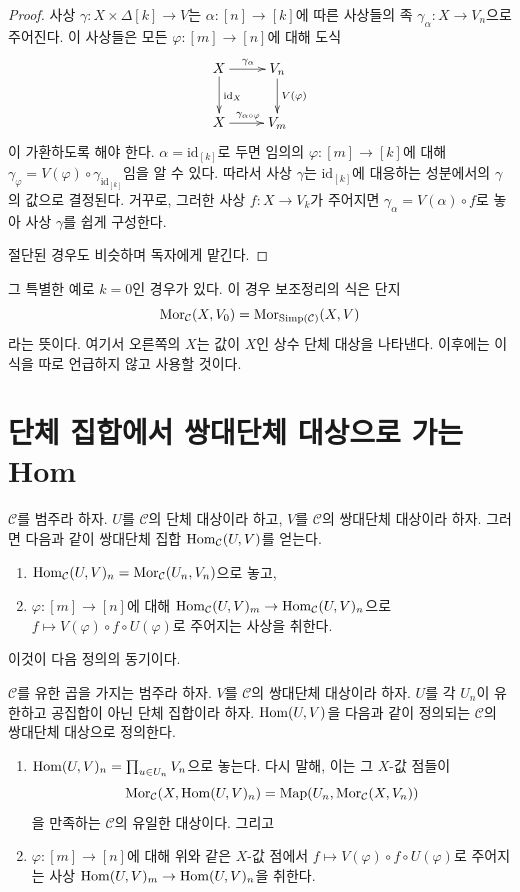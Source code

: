 \begin{proof}
사상 $\gamma : X \times \Delta[k] \to V$는
$\alpha : [n] \to [k]$에 따른 사상들의 족
$\gamma_\alpha : X \to V_n$으로 주어진다.
이 사상들은 모든 $\varphi : [m] \to [n]$에 대해 도식
$$
\xymatrix{
X \ar[r]^{\gamma_\alpha} \ar[d]^{\text{id}_X} & V_n \ar[d]^{V(\varphi)} \\
X \ar[r]^{\gamma_{\alpha \circ \varphi}} & V_m
}
$$
이 가환하도록 해야 한다. $\alpha = \text{id}_{[k]}$로 두면
임의의 $\varphi : [m] \to [k]$에 대해
$\gamma_\varphi = V(\varphi) \circ \gamma_{\text{id}_{[k]}}$임을 알 수 있다.
따라서 사상 $\gamma$는 $\text{id}_{[k]}$에 대응하는 성분에서의
$\gamma$의 값으로 결정된다. 거꾸로, 그러한 사상
$f : X \to V_k$가 주어지면
$\gamma_\alpha = V(\alpha) \circ f$로 놓아 사상 $\gamma$를 쉽게 구성한다.

\medskip\noindent
절단된 경우도 비슷하며 독자에게 맡긴다.
\end{proof}

\noindent
그 특별한 예로 $k = 0$인 경우가 있다.
이 경우 보조정리의 식은 단지
$$
\mathop{\mathrm{Mor}}\nolimits_\mathcal{C}(X, V_0)
=
\mathop{\mathrm{Mor}}\nolimits_{\text{Simp}(\mathcal{C})}(X, V)
$$
라는 뜻이다. 여기서 오른쪽의 $X$는 값이 $X$인 상수 단체 대상을
나타낸다. 이후에는 이 식을 따로 언급하지 않고 사용할 것이다.




\section{단체 집합에서 쌍대단체 대상으로 가는 Hom}
\label{section-hom-from-simplicial-sets-into-cosimplicial}

\noindent
$\mathcal{C}$를 범주라 하자.
$U$를 $\mathcal{C}$의 단체 대상이라 하고,
$V$를 $\mathcal{C}$의 쌍대단체 대상이라 하자.
그러면 다음과 같이 쌍대단체 집합 $\mathop{\mathrm{Hom}}\nolimits_\mathcal{C}(U, V)$를 얻는다.
\begin{enumerate}
\item $\mathop{\mathrm{Hom}}\nolimits_\mathcal{C}(U, V)_n = \mathop{\mathrm{Mor}}\nolimits_\mathcal{C}(U_n, V_n)$으로 놓고,
\item $\varphi : [m] \to [n]$에 대해
$\mathop{\mathrm{Hom}}\nolimits_\mathcal{C}(U, V)_m \to \mathop{\mathrm{Hom}}\nolimits_\mathcal{C}(U, V)_n$으로
$f \mapsto V(\varphi) \circ f \circ U(\varphi)$로 주어지는 사상을 취한다.
\end{enumerate}
이것이 다음 정의의 동기이다.

\begin{definition}
\label{definition-hom-deltak-cosimplicial}
$\mathcal{C}$를 유한 곱을 가지는 범주라 하자.
$V$를 $\mathcal{C}$의 쌍대단체 대상이라 하자.
$U$를 각 $U_n$이 유한하고 공집합이 아닌 단체 집합이라 하자.
{{\it $\mathop{\mathrm{Hom}}\nolimits(U, V)$}}을 다음과 같이 정의되는
$\mathcal{C}$의 쌍대단체 대상으로 정의한다.
\begin{enumerate}
\item $\mathop{\mathrm{Hom}}\nolimits(U, V)_n = \prod_{u \in U_n} V_n$으로 놓는다.
다시 말해, 이는 그 $X$-값 점들이
$$
\mathop{\mathrm{Mor}}\nolimits_\mathcal{C}(X, \mathop{\mathrm{Hom}}\nolimits(U, V)_n)
=
\text{Map}(U_n, \mathop{\mathrm{Mor}}\nolimits_\mathcal{C}(X, V_n))
$$
을 만족하는 $\mathcal{C}$의 유일한 대상이다. 그리고
\item $\varphi : [m] \to [n]$에 대해 위와 같은 $X$-값 점에서
$f \mapsto V(\varphi) \circ f \circ U(\varphi)$로 주어지는 사상
$\mathop{\mathrm{Hom}}\nolimits(U, V)_m \to \mathop{\mathrm{Hom}}\nolimits(U, V)_n$을 취한다.
\end{enumerate}
\end{definition}

